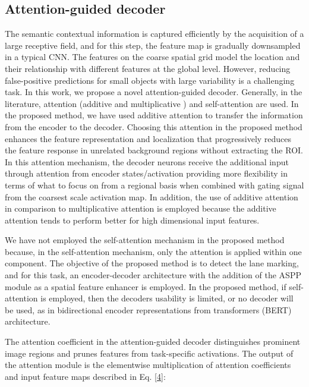 \documentclass[journal]{IEEEtran}
\begin{document}
\subsection{Attention-guided decoder}
The semantic contextual information is captured efficiently by the acquisition of a large receptive field, and for this step, the feature map is gradually downsampled in a typical CNN. The features on the coarse spatial grid model the location and their relationship with different features at the global level. However, reducing false-positive predictions for small objects with large variability is a challenging task. In this work, we propose a novel attention-guided decoder. 
Generally, in the literature, attention (additive \cite{bahdanau2014neural} and multiplicative \cite{luong2015effective}) and self-attention are used. In the proposed method, we have used additive attention \cite{bahdanau2014neural} to transfer the information from the encoder to the decoder. Choosing this attention in the proposed method enhances the feature representation and localization that progressively reduces the feature response in unrelated background regions without extracting the ROI. In this attention mechanism, the decoder neurons receive the additional input through attention from encoder states/activation providing more flexibility in terms of what to focus on from a regional basis when combined with gating signal from the coarsest scale activation map. In addition, the use of additive attention in comparison to multiplicative attention is employed because the additive attention tends to perform better for high dimensional input features.
\par
We have not employed the self-attention mechanism in the proposed method because, in the self-attention mechanism, only the attention is applied within one component. The objective of the proposed method is to detect the lane marking, and for this task, an encoder-decoder architecture with the addition of the ASPP module as a spatial feature enhancer is employed. In the proposed method, if self-attention is employed, then the decoders usability is limited, or no decoder will be used, as in bidirectional encoder representations from transformers (BERT) \cite{devlin2018bert} architecture.
\par
The attention coefficient  in the attention-guided decoder distinguishes prominent image regions and prunes features from task-specific activations. The output of the attention module is the elementwise multiplication of attention coefficients and input feature maps described in Eq. \ref{4}:
\end{document}

